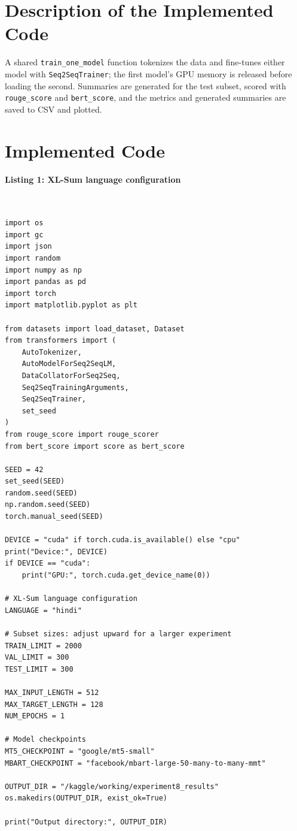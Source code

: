\documentclass[12pt,a4paper,oneside]{report}
\begin{document}
\section{Description of the Implemented Code}
A shared \texttt{train\_one\_model} function tokenizes the data and fine-tunes either model with \texttt{Seq2SeqTrainer}; the first model's GPU memory is released before loading the second. Summaries are generated for the test subset, scored with \texttt{rouge\_score} and \texttt{bert\_score}, and the metrics and generated summaries are saved to CSV and plotted.


\section{Implemented Code}
\paragraph{Listing 1: XL-Sum language configuration}\mbox{}\\[-1ex]
\begin{Verbatim}[commandchars=\\\{\},breaklines=true,breakanywhere=true,fontsize=\scriptsize,frame=leftline,framesep=2mm,rulecolor=\color{gray}]
import os
import gc
import json
import random
import numpy as np
import pandas as pd
import torch
import matplotlib.pyplot as plt

from datasets import load_dataset, Dataset
from transformers import (
    AutoTokenizer,
    AutoModelForSeq2SeqLM,
    DataCollatorForSeq2Seq,
    Seq2SeqTrainingArguments,
    Seq2SeqTrainer,
    set_seed
)
from rouge_score import rouge_scorer
from bert_score import score as bert_score

SEED = 42
set_seed(SEED)
random.seed(SEED)
np.random.seed(SEED)
torch.manual_seed(SEED)

DEVICE = "cuda" if torch.cuda.is_available() else "cpu"
print("Device:", DEVICE)
if DEVICE == "cuda":
    print("GPU:", torch.cuda.get_device_name(0))

# XL-Sum language configuration
LANGUAGE = "hindi"

# Subset sizes: adjust upward for a larger experiment
TRAIN_LIMIT = 2000
VAL_LIMIT = 300
TEST_LIMIT = 300

MAX_INPUT_LENGTH = 512
MAX_TARGET_LENGTH = 128
NUM_EPOCHS = 1

# Model checkpoints
MT5_CHECKPOINT = "google/mt5-small"
MBART_CHECKPOINT = "facebook/mbart-large-50-many-to-many-mmt"

OUTPUT_DIR = "/kaggle/working/experiment8_results"
os.makedirs(OUTPUT_DIR, exist_ok=True)

print("Output directory:", OUTPUT_DIR)
\end{Verbatim}
\end{document}
